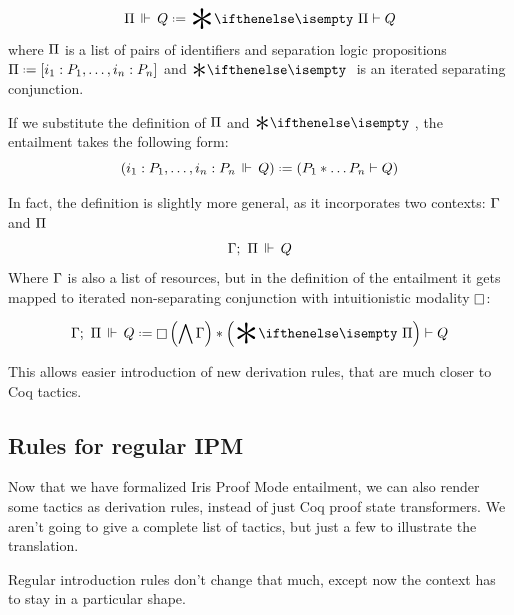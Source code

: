 \[\entailsOneD Q \defeq \Sep \Pi \vdash Q\]
where \(\Pi\) is a list of pairs of identifiers and separation logic propositions \(\SpatD \defeq \left[i_1 : P_1, \ldots , i_n : P_n \right]\) and \(\Sep\) is an iterated separating conjunction.

If we substitute the definition of \(\Pi\) and \(\Sep\), the entailment takes the following form:
\[\left( \entailsOne {i_1 : P_1, \ldots , i_n : P_n} Q \right) \defeq
  \left( P_1 * \ldots P_n \vdash Q \right)\]

In fact, the definition is slightly more general, as it incorporates two contexts: \(\Gamma\) and \(\Pi\)
\[\Gamma ;\,\, \Pi \,\Vdash\, Q\]
Where \(\Gamma\) is also a list of resources, but in the definition of the entailment it gets mapped to iterated non-separating conjunction with intuitionistic modality \(\mathop{\Box}\):

\[\entailsD Q \defeq \intuit \left(\bigwedge \IntuD\right) * \left(\Sep \SpatD\right) \vdash Q\]

This allows easier introduction of new derivation rules, that are much closer to Coq tactics.

\subsection{Rules for regular IPM}
\label{sec:rules-regular-ipm}

Now that we have formalized Iris Proof Mode entailment, we can also render some tactics as derivation rules, instead of just Coq proof state transformers.
We aren't going to give a complete list of tactics, but just a few to illustrate the translation.

Regular introduction rules don't change that much, except now the context has to stay in a particular shape.

